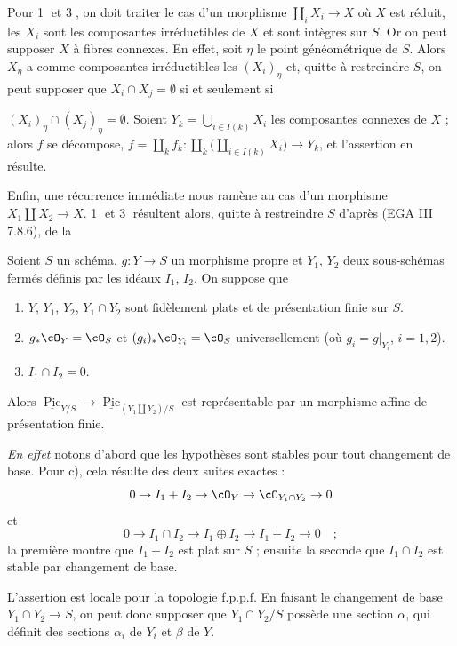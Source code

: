 Pour \textcircled{1} et \textcircled{3}, on doit traiter le cas d'un morphisme $\coprod_i X_i \to X$ où $X$ est réduit, les $X_i$ sont les composantes irréductibles de $X$ et sont intègres sur $S$. Or on peut supposer $X$ à fibres connexes. En effet, soit $\eta$ le point généométrique de $S$. Alors $X_{\eta}$ a comme composantes irréductibles les $(X_i)_{\eta}$ et, quitte à restreindre $S$, on peut supposer que $X_i \cap X_j = \emptyset$ si et seulement si

$(X_i)_{\eta} \cap (X_j)_{\eta} = \emptyset$. Soient $Y_k = \bigcup_{i \in I(k)} X_i$ les composantes connexes de $X$ ; alors $f$ se décompose, $f = \coprod_k f_k : \coprod_k \bigl( \coprod_{i \in I(k)} X_i \bigr) \to Y_k$, et l'assertion en résulte.

Enfin, une récurrence immédiate nous ramène au cas d'un morphisme $X_1 \amalg X_2 \to X$. \textcircled{1} et \textcircled{3} résultent alors, quitte à restreindre $S$ d'après (EGA III 7.8.6), de la

\begin{prop}\label{prop:2.3} Soient $S$ un schéma, $g : Y \to S$ un morphisme propre et $Y_1$, $Y_2$ deux sous-schémas fermés définis par les idéaux $I_1$, $I_2$. On suppose que
\begin{enumerate}[label={\alph*)}]
\item $Y$, $Y_1$, $Y_2$, $Y_1 \cap Y_2$ sont fidèlement plats et de présentation finie sur $S$.
\item $g_* \cO_Y = \cO_S$ et $(g_i)_* \cO_{Y_i} = \cO_S$ universellement \textup{(}où $g_i = g|_{Y_i}$, $i=1,2$\textup{)}.
\item $I_1 \cap I_2 = 0$.
\end{enumerate}
Alors $\underline{\operatorname{Pic}}_{Y/S} \to \underline{\operatorname{Pic}}_{(Y_1 \amalg Y_2)/S}$ est représentable par un morphisme affine de présentation finie.
\end{prop}

\noindent\textit{En effet} notons d'abord que les hypothèses sont stables pour tout changement de base. Pour c), cela résulte des deux suites exactes :
\[
0 \to I_1 + I_2 \to \cO_Y \to \cO_{Y_1 \cap Y_2} \to 0
\]
et
\[
0 \to I_1 \cap I_2 \to I_1 \oplus I_2 \to I_1 + I_2 \to 0 \quad ;
\]
la première montre que $I_1 + I_2$ est plat sur $S$ ; ensuite la seconde que $I_1 \cap I_2$ est stable par changement de base.

L'assertion est locale pour la topologie f.p.p.f. En faisant le changement de base $Y_1 \cap Y_2 \to S$, on peut donc supposer que $Y_1 \cap Y_2/S$ possède une section $\alpha$, qui définit des sections $\alpha_i$ de $Y_i$ et $\beta$ de $Y$.


